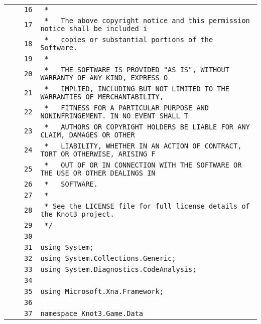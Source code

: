 \documentclass[a4paper,10pt]{article}
\begin{document}
\begin{longtable}[l]{lrrl}
\cellcolor{gray} &  & \verb~16~ & \verb~ *~\\
\cellcolor{gray} &  & \verb~17~ & \verb~ *   The above copyright notice and this permission notice shall be included i~\\
\cellcolor{gray} &  & \verb~18~ & \verb~ *   copies or substantial portions of the Software.~\\
\cellcolor{gray} &  & \verb~19~ & \verb~ *~\\
\cellcolor{gray} &  & \verb~20~ & \verb~ *   THE SOFTWARE IS PROVIDED "AS IS", WITHOUT WARRANTY OF ANY KIND, EXPRESS O~\\
\cellcolor{gray} &  & \verb~21~ & \verb~ *   IMPLIED, INCLUDING BUT NOT LIMITED TO THE WARRANTIES OF MERCHANTABILITY,~\\
\cellcolor{gray} &  & \verb~22~ & \verb~ *   FITNESS FOR A PARTICULAR PURPOSE AND NONINFRINGEMENT. IN NO EVENT SHALL T~\\
\cellcolor{gray} &  & \verb~23~ & \verb~ *   AUTHORS OR COPYRIGHT HOLDERS BE LIABLE FOR ANY CLAIM, DAMAGES OR OTHER~\\
\cellcolor{gray} &  & \verb~24~ & \verb~ *   LIABILITY, WHETHER IN AN ACTION OF CONTRACT, TORT OR OTHERWISE, ARISING F~\\
\cellcolor{gray} &  & \verb~25~ & \verb~ *   OUT OF OR IN CONNECTION WITH THE SOFTWARE OR THE USE OR OTHER DEALINGS IN~\\
\cellcolor{gray} &  & \verb~26~ & \verb~ *   SOFTWARE.~\\
\cellcolor{gray} &  & \verb~27~ & \verb~ *~\\
\cellcolor{gray} &  & \verb~28~ & \verb~ * See the LICENSE file for full license details of the Knot3 project.~\\
\cellcolor{gray} &  & \verb~29~ & \verb~ */~\\
\cellcolor{gray} &  & \verb~30~ & \verb~~\\
\cellcolor{gray} &  & \verb~31~ & \verb~using System;~\\
\cellcolor{gray} &  & \verb~32~ & \verb~using System.Collections.Generic;~\\
\cellcolor{gray} &  & \verb~33~ & \verb~using System.Diagnostics.CodeAnalysis;~\\
\cellcolor{gray} &  & \verb~34~ & \verb~~\\
\cellcolor{gray} &  & \verb~35~ & \verb~using Microsoft.Xna.Framework;~\\
\cellcolor{gray} &  & \verb~36~ & \verb~~\\
\cellcolor{gray} &  & \verb~37~ & \verb~namespace Knot3.Game.Data~\\

\end{longtable}
\end{document}
